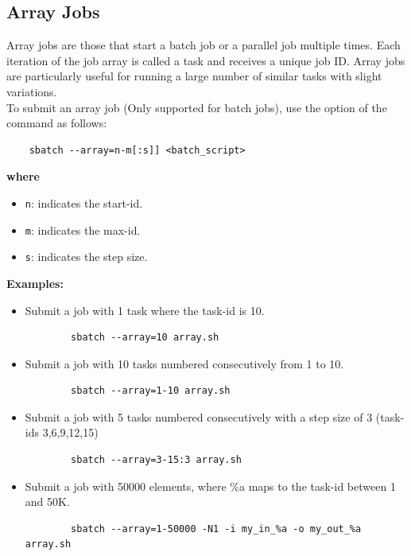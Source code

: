 \subsection{Array Jobs}
\label{sect:array-jobs}

Array jobs are those that start a batch job or a parallel job multiple times.
Each iteration of the job array is called a task and receives a unique job ID.
Array jobs are particularly useful for running a large number of similar tasks with slight variations.\\

\noindent
To submit an array job (Only supported for batch jobs), use the  option of the  
command as follows:

\begin{verbatim}
	sbatch --array=n-m[:s]] <batch_script>
\end{verbatim}

\noindent \textbf{where}
\begin{itemize}
	\item
	\texttt{n}: indicates the start-id.
	\item
	\texttt{m}: indicates the max-id.
	\item
	\texttt{s}: indicates the step size.
\end{itemize}

\noindent \textbf{Examples:}
\begin{itemize}
	\item Submit a job with 1 task where the task-id is 10. 
	\begin{verbatim}
		sbatch --array=10 array.sh
	\end{verbatim}

	\item Submit a job with 10 tasks numbered consecutively from 1 to 10.
	\begin{verbatim}
		sbatch --array=1-10 array.sh
	\end{verbatim}

	\item Submit a job with 5 tasks numbered consecutively with a step size of 3 (task-ids 3,6,9,12,15)
	\begin{verbatim}
		sbatch --array=3-15:3 array.sh
	\end{verbatim}

	\item Submit a job with 50000 elements, where \%a maps to the task-id between 1 and 50K. 
	\begin{verbatim}
		sbatch --array=1-50000 -N1 -i my_in_%a -o my_out_%a array.sh
	\end{verbatim}
\end{itemize}

